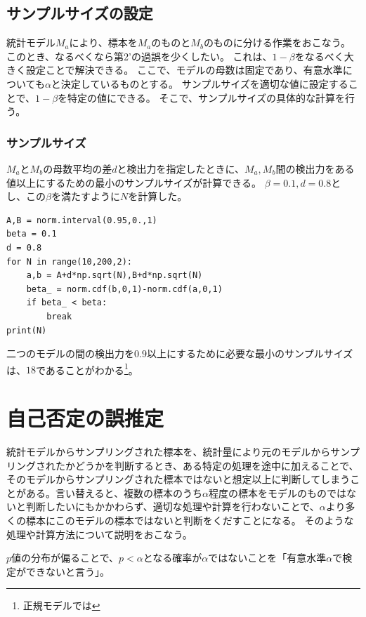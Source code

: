 \subsection{サンプルサイズの設定}
統計モデル$M_a$により、標本を$M_a$のものと$M_b$のものに分ける作業をおこなう。
このとき、なるべくなら第2'の過誤を少くしたい。
これは、$1-\beta$をなるべく大きく設定ことで解決できる。
ここで、モデルの母数は固定であり、有意水準についても$\alpha$と決定しているものとする。
サンプルサイズを適切な値に設定することで、$1-\beta$を特定の値にできる。
そこで、サンプルサイズの具体的な計算を行う。

\subsubsection{サンプルサイズ}
$M_a$と$M_b$の母数平均の差$d$と検出力を指定したときに、$M_a,M_b$間の検出力をある値以上にするための最小のサンプルサイズが計算できる。
$\beta=0.1,d=0.8$とし、この$\beta$を満たすように$N$を計算した。

\begin{lstlisting}
A,B = norm.interval(0.95,0.,1)
beta = 0.1
d = 0.8
for N in range(10,200,2):
    a,b = A+d*np.sqrt(N),B+d*np.sqrt(N)
    beta_ = norm.cdf(b,0,1)-norm.cdf(a,0,1)
    if beta_ < beta:
        break
print(N)
\end{lstlisting}
二つのモデルの間の検出力を$0.9$以上にするために必要な最小のサンプルサイズは、$18$であることがわかる\footnote{正規モデルでは}。

\section{自己否定の誤推定}
統計モデルからサンプリングされた標本を、統計量により元のモデルからサンプリングされたかどうかを判断するとき、ある特定の処理を途中に加えることで、そのモデルからサンプリングされた標本ではないと想定以上に判断してしまうことがある。言い替えると、複数の標本のうち$\alpha$程度の標本をモデルのものではないと判断したいにもかかわらず、適切な処理や計算を行わないことで、$\alpha$より多くの標本にこのモデルの標本ではないと判断をくだすことになる。
そのような処理や計算方法について説明をおこなう。
\begin{defi}
  $p$値の分布が偏ることで、$p<\alpha$となる確率が$\alpha$ではないことを「有意水準$\alpha$で検定ができないと言う」。
\end{defi}



